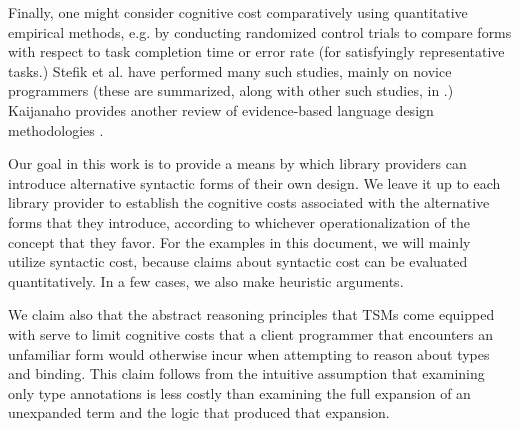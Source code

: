 Finally, one might consider cognitive cost comparatively using quantitative empirical methods, e.g. by conducting randomized control trials to compare forms with respect to task completion time or error rate (for satisfyingly representative tasks.) Stefik et al. have performed many such studies, mainly on novice programmers (these are summarized, along with other such studies, in \cite{journals/jeric/StefikS13}.) Kaijanaho provides another review of evidence-based language design methodologies \cite{kaijanaho2015evidence}.

Our goal in this work is to provide a means by which library providers can introduce alternative syntactic forms of their own design. We leave it up to each library provider to establish the cognitive costs associated with the alternative forms that they introduce, according to whichever operationalization of the concept that they favor. For the examples in this document, we will mainly utilize syntactic cost, because claims about syntactic cost can be evaluated quantitatively. In a few cases, we also make heuristic arguments. 

We claim also that the abstract reasoning principles that TSMs come equipped with serve to limit cognitive costs that a client programmer that encounters an unfamiliar form would otherwise incur when attempting to reason about types and binding. This claim follows from the intuitive assumption that examining only type annotations is less costly than examining the full expansion of an unexpanded term and the logic that produced that expansion. 




